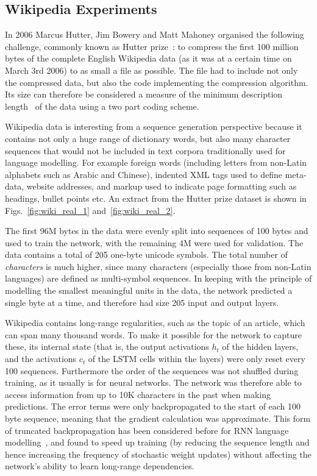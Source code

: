 \subsection{Wikipedia Experiments} In 2006 Marcus Hutter, Jim Bowery and Matt Mahoney organised the following challenge, commonly known as Hutter prize~\cite{hutter06prize}: to compress the first 100 million bytes of the complete English Wikipedia data (as it was at a certain time on March 3rd 2006) to as small a file as possible. The file had to include not only the compressed data, but also the code implementing the compression algorithm. Its size can therefore be considered a measure of the minimum description length~\cite{grunwald07mdl} of the data using a two part coding scheme.

Wikipedia data is interesting from a sequence generation perspective because it contains not only a huge range of dictionary words, but also many character sequences that would not be included in text corpora traditionally used for language modelling. For example foreign words (including letters from non-Latin alphabets such as Arabic and Chinese), indented XML tags used to define meta-data, website addresses, and markup used to indicate page formatting such as headings, bullet points etc. An extract from the Hutter prize dataset is shown in Figs.~\ref{fig:wiki_real_1} and~\ref{fig:wiki_real_2}.

The first 96M bytes in the data were evenly split into sequences of 100 bytes and used to train the network, with the remaining 4M were used for validation. The data contains a total of 205 one-byte unicode symbols. The total number of \emph{characters} is much higher, since many characters (especially those from non-Latin languages) are defined as multi-symbol sequences. In keeping with the principle of modelling the smallest meaningful units in the data, the network predicted a single byte at a time, and therefore had size 205 input and output layers.

Wikipedia contains long-range regularities, such as the topic of an article, which can span many thousand words. To make it possible for the network to capture these, its internal state (that is, the output activations $h_t$ of the hidden layers, and the activations $c_t$ of the LSTM cells within the layers) were only reset every 100 sequences. Furthermore the order of the sequences was not shuffled during training, as it usually is for neural networks. The network was therefore able to access information from up to 10K characters in the past when making predictions. The error terms were only backpropagated to the start of each 100 byte sequence, meaning that the gradient calculation was approximate. This form of truncated backpropagation has been considered before for RNN language modelling~\cite{mikolov12thesis}, and found to speed up training (by reducing the sequence length and hence increasing the frequency of stochastic weight updates) without affecting the network's ability to learn long-range dependencies.

